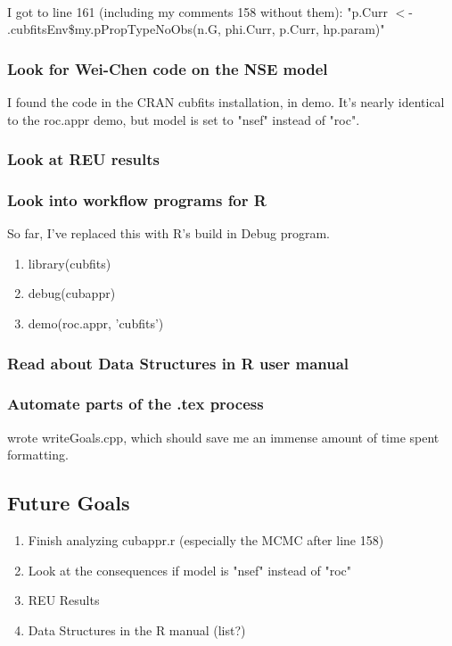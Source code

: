 \documentclass[11pt]{article} %
\begin{document}
~

I got to line 161 (including my comments 158 without them): "p.Curr $<$- .cubfitsEnv\$my.pPropTypeNoObs(n.G, phi.Curr, p.Curr, hp.param)"


\subsubsection{Look for Wei-Chen code on the NSE model}
I found the code in the CRAN cubfits installation, in demo. It's nearly identical to the roc.appr demo, but model is set to "nsef" instead of "roc".

\subsubsection{Look at REU results}

\subsubsection{Look into workflow programs for R}
So far, I've replaced this with R's build in Debug program.

\begin{enumerate}
\item library(cubfits)
\item debug(cubappr)
\item demo(roc.appr, 'cubfits')
\end{enumerate}

\subsubsection{Read about Data Structures in R user manual}

\subsubsection{Automate parts of the .tex process}
wrote writeGoals.cpp, which should save me an immense amount of time spent formatting.

\subsection{Future Goals}
\begin{enumerate}
\item Finish analyzing cubappr.r (especially the MCMC after line 158)
\item Look at the consequences if model is "nsef" instead of "roc"
\item REU Results
\item Data Structures in the R manual (list?)
\end{enumerate}
\end{document}
